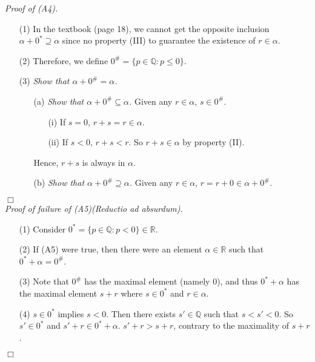 \documentclass{article}
\begin{document}
\emph{Proof of (A4).}
\begin{enumerate}
\item[(1)]
In the textbook (page 18),
we cannot get the opposite inclusion $\alpha + 0^* \supseteq \alpha$
since no property (III) to guarantee the existence of $r \in \alpha$.
\item[(2)]
Therefore, we define $0^{\#} = \{ p \in \mathbb{Q} : p \leq 0 \}$.
\item[(3)]
\emph{Show that $\alpha + 0^{\#} = \alpha$.}
  \begin{enumerate}
  \item[(a)]
  \emph{Show that $\alpha + 0^{\#} \subseteq \alpha$.}
  Given any $r \in \alpha$, $s \in 0^{\#}$.
    \begin{enumerate}
    \item[(i)]
    If $s = 0$, $r+s = r \in \alpha$.
    \item[(ii)]
    If $s < 0$, $r+s < r$. So $r+s \in \alpha$ by property (II).
    \end{enumerate}
  Hence, $r+s$ is always in $\alpha$.
  \item[(b)]
  \emph{Show that $\alpha + 0^{\#} \supseteq \alpha$.}
  Given any $r \in \alpha$, $r = r + 0 \in \alpha + 0^{\#}$.
  \end{enumerate}
\end{enumerate}
$\Box$ \\

\emph{Proof of failure of (A5)(Reductio ad absurdum).}
\begin{enumerate}
\item[(1)]
Consider $0^{*} = \{ p \in \mathbb{Q} : p < 0 \} \in \mathbb{R}$.
\item[(2)]
If (A5) were true,
then there were an element $\alpha \in \mathbb{R}$ such that $0^{*} + \alpha = 0^{\#}$.
\item[(3)]
Note that $0^{\#}$ has the maximal element (namely $0$), and thus
$0^{*} + \alpha$ has the maximal element $s+r$ where $s \in 0^{*}$ and $r \in \alpha$.
\item[(4)]
$s \in 0^{*}$ implies $s < 0$.
Then there exists $s' \in \mathbb{Q}$ such that $s < s' < 0$.
So $s' \in 0^{*}$ and $s'+r \in 0^{*} + \alpha$.
$s'+r > s+r$, contrary to the maximality of $s+r$.
\end{enumerate}
$\Box$ \\\\




\end{document}
